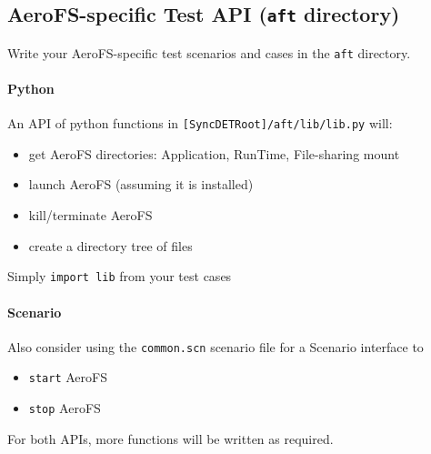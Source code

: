 \subsection{AeroFS-specific Test API ({\tt aft} directory)}
Write your AeroFS-specific test scenarios and cases in the {\tt aft} directory.

\paragraph{Python} 
An API of python functions in {\tt [SyncDETRoot]/aft/lib/lib.py} will:
\begin{itemize}
\item get AeroFS directories: Application, RunTime, File-sharing mount
\item launch AeroFS (assuming it is installed)
\item kill/terminate AeroFS
\item create a directory tree of files
\end{itemize}
Simply {\tt import lib} from your test cases


\paragraph{Scenario}
Also consider using the {\tt common.scn} scenario file for a Scenario interface
to 
\begin{itemize}
\item {\tt start} AeroFS
\item {\tt stop} AeroFS
\end{itemize}

For both APIs, more functions will be written as required.
